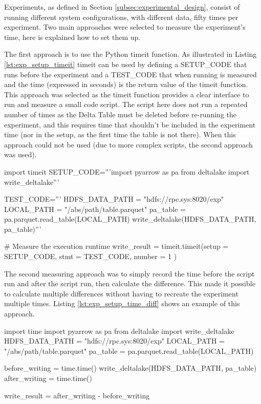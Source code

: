 Experiments, as defined in Section \ref{subsec:experimental_design}, consist of running different system configurations, with different data, fifty times per experiment. Two main approaches were selected to measure the experiment's time, here is explained how to set them up.

The first approach is to use the Python timeit function. As illustrated in Listing \ref{lst:exp_setup_timeit} timeit can be used by defining a SETUP\_CODE that runs before the experiment and a TEST\_CODE that when running is measured and the time (expressed in seconds) is the return value of the timeit function. This approach was selected as the timeit function provides a clear interface to run and measure a small code script. The script here does not run a repeated number of times as the Delta Table must be deleted before re-running the experiment, and this requires time that shouldn't be included in the experiment time (nor in the setup, as the first time the table is not there). When this approach could not be used (due to more complex scripts, the second approach was used).

\begin{python}[caption={Timeit usage to measure the time required to write a Delta Lake table to \gls{HopsFS}.}, label={lst:exp_setup_timeit}]
import timeit
SETUP_CODE='''import pyarrow as pa
from deltalake import write_deltalake'''
    
TEST_CODE='''
HDFS_DATA_PATH = "hdfs://rpc.sys:8020/exp" 
LOCAL_PATH = "/abs/path/table.parquet"
pa_table = pa.parquet.read_table(LOCAL_PATH)
write_deltalake(HDFS_DATA_PATH, pa_table)'''

# Measure the execution runtime
write_result = timeit.timeit(setup  = SETUP_CODE,
                             stmt   = TEST_CODE,
                             number = 1          )
\end{python}
\medskip

The second measuring approach was to simply record the time before the script run and after the script run, then calculate the difference. This made it possible to calculate multiple differences without having to recreate the experiment multiple times. Listing \ref{lst:exp_setup_time_diff} shows an example of this approach.

\begin{python}[caption={A simple time difference approach to measure the time required to write a Delta Lake table to \gls{HopsFS}.}, label={lst:exp_setup_time_diff}]
import time
import pyarrow as pa
from deltalake import write_deltalake
HDFS_DATA_PATH = "hdfs://rpc.sys:8020/exp" 
LOCAL_PATH = "/abs/path/table.parquet"
pa_table = pa.parquet.read_table(LOCAL_PATH)

before_writing = time.time()
write_deltalake(HDFS_DATA_PATH, pa_table)
after_writing = time.time()

write_result = after_writing - before_writing
\end{python}

